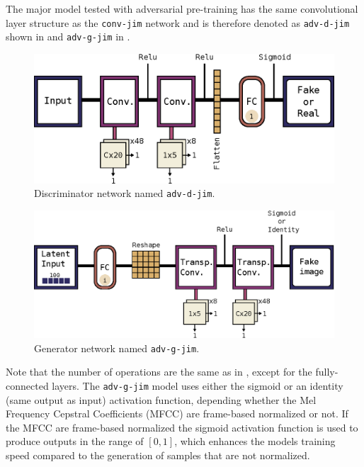 The major model tested with adversarial pre-training has the same convolutional layer structure as the \texttt{conv-jim} network and is therefore denoted as \texttt{adv-d-jim} shown in  and \texttt{adv-g-jim} in .
\begin{figure}[!ht]
  \centering
    \includegraphics[height=0.2\textwidth]{./4_nn/figs/nn_arch_adv_d_jim.eps}
  \caption{Discriminator network named \texttt{adv-d-jim}.}
  \label{fig:nn_arch_adv_d_jim}
\end{figure}
\FloatBarrier
\noindent
\begin{figure}[!ht]
  \centering
    \includegraphics[height=0.23\textwidth]{./4_nn/figs/nn_arch_adv_g_jim.eps}
  \caption{Generator network named \texttt{adv-g-jim}.}
  \label{fig:nn_arch_adv_g_jim}
\end{figure}
\FloatBarrier
\noindent
Note that the number of operations are the same as in , except for the fully-connected layers.
The \texttt{adv-g-jim} model uses either the sigmoid or an identity (same output as input) activation function, depending whether the Mel Frequency Cepstral Coefficients (MFCC) are frame-based normalized or not.
If the MFCC are frame-based normalized the sigmoid activation function is used to produce outputs in the range of $[0, 1]$, which enhances the models training speed compared to the generation of samples that are not normalized.
%
%



